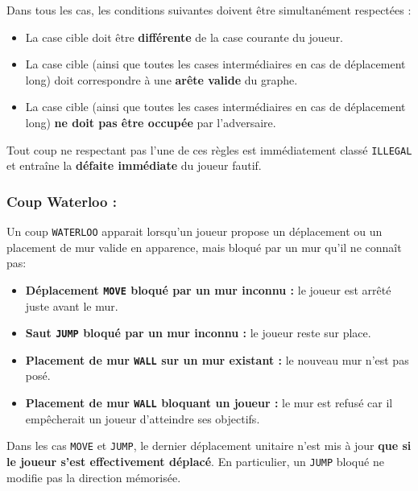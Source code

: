 \documentclass[12pt,a4paper]{article}
\begin{document}
Dans tous les cas, les conditions suivantes doivent être simultanément respectées :

\begin{itemize}
    \item La case cible doit être \textbf{différente} de la case courante du joueur.
    \item La case cible (ainsi que toutes les cases intermédiaires en cas de 
    déplacement long) doit correspondre à une \textbf{arête valide} du graphe.
    \item La case cible (ainsi que toutes les cases intermédiaires en cas de 
    déplacement long) \textbf{ne doit pas être occupée} par l'adversaire.
\end{itemize}

Tout coup ne respectant pas l'une de ces règles est immédiatement classé 
\texttt{ILLEGAL} et entraîne la \textbf{défaite immédiate} du joueur fautif.

\subsubsection*{Coup Waterloo :} 

Un coup \texttt{WATERLOO} apparait lorsqu'un joueur propose un déplacement ou 
un placement de mur valide en apparence, mais bloqué par un mur qu'il ne 
connaît pas:

\begin{itemize}
    \item \textbf{Déplacement \texttt{MOVE} bloqué par un mur inconnu :} 
    le joueur est arrêté juste avant le mur.

    \item \textbf{Saut \texttt{JUMP} bloqué par un mur inconnu :} 
    le joueur reste sur place.

    \item \textbf{Placement de mur \texttt{WALL} sur un mur existant :} 
    le nouveau mur n'est pas posé.

    \item \textbf{Placement de mur \texttt{WALL} bloquant un joueur :} 
    le mur est refusé car il empêcherait un joueur d'atteindre ses objectifs. 
\end{itemize}

Dans les cas \texttt{MOVE} et \texttt{JUMP}, le dernier déplacement unitaire 
n'est mis à jour \textbf{que si le joueur s'est effectivement déplacé}. 
En particulier, un \texttt{JUMP} bloqué ne modifie pas la direction mémorisée.
\end{document}
